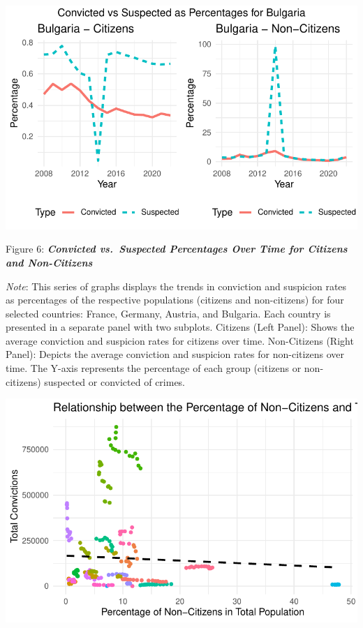 \documentclass[
]{article}
\begin{document}
\includegraphics{DataMan_Project_files/figure-pdf/unnamed-chunk-31-4.pdf}

Figure 6: \textbf{\emph{Convicted vs.~Suspected Percentages Over Time
for Citizens and Non-Citizens}}

\emph{Note}: This series of graphs displays the trends in conviction and
suspicion rates as percentages of the respective populations (citizens
and non-citizens) for four selected countries: France, Germany, Austria,
and Bulgaria. Each country is presented in a separate panel with two
subplots. Citizens (Left Panel): Shows the average conviction and
suspicion rates for citizens over time. Non-Citizens (Right Panel):
Depicts the average conviction and suspicion rates for non-citizens over
time. The Y-axis represents the percentage of each group (citizens or
non-citizens) suspected or convicted of crimes.

\includegraphics{DataMan_Project_files/figure-pdf/unnamed-chunk-32-1.pdf}
\end{document}
